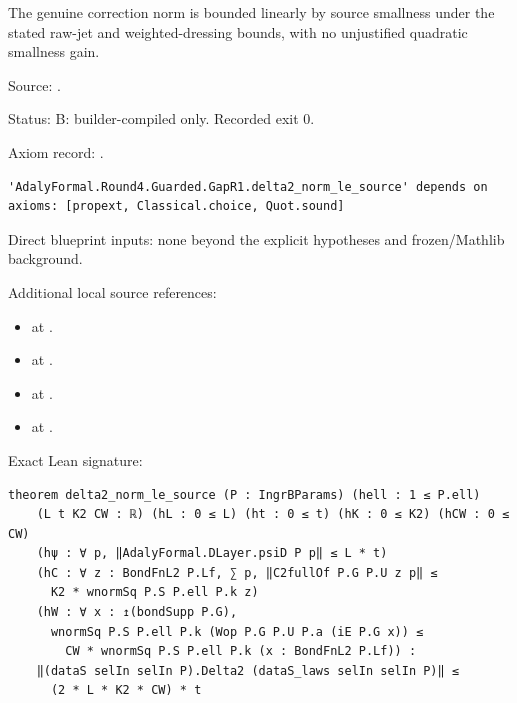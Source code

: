 \begin{theorem}[bp-035]
\label{bp-035}
\uses{}
\leanok
The genuine correction norm is bounded linearly by source smallness under the stated raw-jet and weighted-dressing bounds, with no unjustified quadratic smallness gain.

\par Source: \texttt{}.
\par Status: B: builder-compiled only. Recorded exit 0.
\par Axiom record: \texttt{}.
\begin{verbatim}
'AdalyFormal.Round4.Guarded.GapR1.delta2_norm_le_source' depends on axioms: [propext, Classical.choice, Quot.sound]
\end{verbatim}
\par Direct blueprint inputs: none beyond the explicit hypotheses and frozen/Mathlib background.
\par Additional local source references:
\begin{itemize}
\item \texttt{} at \texttt{}.
\item \texttt{} at \texttt{}.
\item \texttt{} at \texttt{}.
\item \texttt{} at \texttt{}.
\end{itemize}
\par Exact Lean signature:
\begin{verbatim}
theorem delta2_norm_le_source (P : IngrBParams) (hell : 1 ≤ P.ell)
    (L t K2 CW : ℝ) (hL : 0 ≤ L) (ht : 0 ≤ t) (hK : 0 ≤ K2) (hCW : 0 ≤ CW)
    (hψ : ∀ p, ‖AdalyFormal.DLayer.psiD P p‖ ≤ L * t)
    (hC : ∀ z : BondFnL2 P.Lf, ∑ p, ‖C2fullOf P.G P.U z p‖ ≤
      K2 * wnormSq P.S P.ell P.k z)
    (hW : ∀ x : ↥(bondSupp P.G),
      wnormSq P.S P.ell P.k (Wop P.G P.U P.a (iE P.G x)) ≤
        CW * wnormSq P.S P.ell P.k (x : BondFnL2 P.Lf)) :
    ‖(dataS selIn selIn P).Delta2 (dataS_laws selIn selIn P)‖ ≤
      (2 * L * K2 * CW) * t
\end{verbatim}
\end{theorem}

